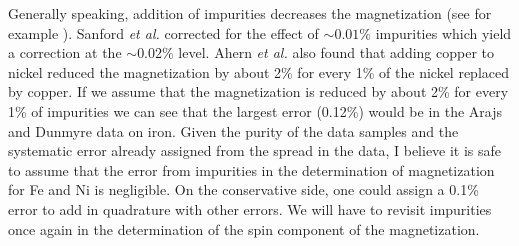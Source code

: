 \documentclass[12pt]{article}
\begin{document}
Generally speaking, addition of impurities decreases the magnetization (see for example \cite{Luborsky1980, Ahern1958, Sanford1941}). Sanford {\it et al.} corrected for the effect of $\sim0.01\%$ impurities which yield a correction at the $\sim0.02\%$ level\cite{Sanford1941}. Ahern {\it et al.} also found that adding copper to nickel reduced the magnetization by about 2\% for every 1\% of the nickel replaced by copper. If we assume that the magnetization is reduced by about 2\% for every 1\% of impurities we can see that the largest error (0.12\%) would be in the Arajs and Dunmyre data on iron. Given the purity of the data samples and the systematic error already assigned from the spread in the data, I believe it is safe to assume that the error from impurities in the determination of magnetization for Fe and Ni is negligible. On the conservative side, one could assign a 0.1\% error to add in quadrature with other errors. We will have to revisit impurities once again in the determination of the spin component of the magnetization.
\end{document}

